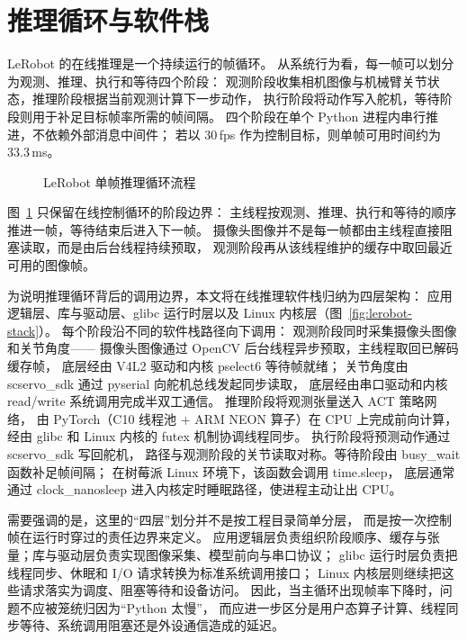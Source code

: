 \section{推理循环与软件栈}

LeRobot 的在线推理是一个持续运行的帧循环。
从系统行为看，每一帧可以划分为观测、推理、执行和等待四个阶段：
观测阶段收集相机图像与机械臂关节状态，推理阶段根据当前观测计算下一步动作，
执行阶段将动作写入舵机，等待阶段则用于补足目标帧率所需的帧间隔。
四个阶段在单个 Python 进程内串行推进，不依赖外部消息中间件；
若以 30\,fps 作为控制目标，则单帧可用时间约为 33.3\,ms。

\begin{figure}[htbp]
  \centering
  
  \caption{LeRobot 单帧推理循环流程}
  \label{fig:record-loop}
\end{figure}

图~\ref{fig:record-loop} 只保留在线控制循环的阶段边界：
主线程按观测、推理、执行和等待的顺序推进一帧，等待结束后进入下一帧。
摄像头图像并不是每一帧都由主线程直接阻塞读取，而是由后台线程持续预取，
观测阶段再从该线程维护的缓存中取回最近可用的图像帧。

为说明推理循环背后的调用边界，本文将在线推理软件栈归纳为四层架构：
应用逻辑层、库与驱动层、glibc 运行时层以及 Linux 内核层（图~\ref{fig:lerobot-stack}）。
每个阶段沿不同的软件栈路径向下调用：
观测阶段同时采集摄像头图像和关节角度——
摄像头图像通过 OpenCV 后台线程异步预取，主线程取回已解码缓存帧，
底层经由 V4L2 驱动和内核 pselect6 等待帧就绪；
关节角度由 scservo\_sdk 通过 pyserial 向舵机总线发起同步读取，
底层经由串口驱动和内核 read/write 系统调用完成半双工通信。
推理阶段将观测张量送入 ACT 策略网络，
由 PyTorch（C10 线程池 + ARM NEON 算子）在 CPU 上完成前向计算，
经由 glibc 和 Linux 内核的 futex 机制协调线程同步。
执行阶段将预测动作通过 scservo\_sdk 写回舵机，
路径与观测阶段的关节读取对称。等待阶段由 busy\_wait 函数补足帧间隔；
在树莓派 Linux 环境下，该函数会调用 time.sleep，
底层通常通过 clock\_nanosleep 进入内核定时睡眠路径，使进程主动让出 CPU。

需要强调的是，这里的“四层”划分并不是按工程目录简单分层，
而是按一次控制帧在运行时穿过的责任边界来定义。
应用逻辑层负责组织阶段顺序、缓存与张量；库与驱动层负责实现图像采集、模型前向与串口协议；
glibc 运行时层负责把线程同步、休眠和 I/O 请求转换为标准系统调用接口；
Linux 内核层则继续把这些请求落实为调度、阻塞等待和设备访问。
因此，当主循环出现帧率下降时，问题不应被笼统归因为“Python 太慢”，
而应进一步区分是用户态算子计算、线程同步等待、系统调用阻塞还是外设通信造成的延迟。

